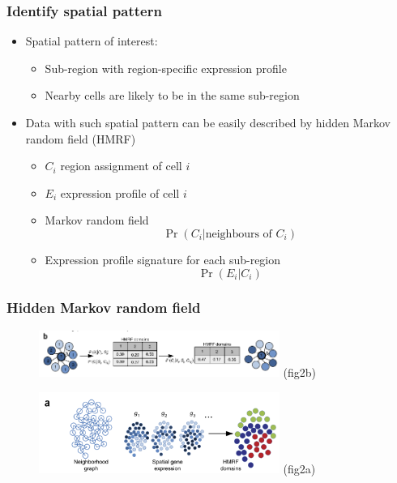 \documentclass{beamer}
\begin{document}
  \begin{frame}
  \frametitle{Identify spatial pattern}
  \begin{itemize}
    \item Spatial pattern of interest:
    \begin{itemize}
      \item Sub-region with region-specific expression profile
      \item Nearby cells are likely to be in the same sub-region
    \end{itemize}
    \item Data with such spatial pattern can be easily described by hidden Markov random field (HMRF)
    \begin{itemize}
      \item $C_i$ region assignment of cell $i$
      \item $E_i$ expression profile of cell $i$
      \item Markov random field
        $$\Pr(C_i | \text{neighbours of } C_i)$$
      \item Expression profile signature for each sub-region
        $$\Pr(E_i | C_i)$$
    \end{itemize}
  \end{itemize}
  \end{frame}

  \begin{frame}
  \frametitle{Hidden Markov random field}
  \begin{figure}
    \centering
    \includegraphics[width=0.7\textwidth]{mrf} (fig2b)
  \end{figure}
  \begin{figure}
    \centering
    \includegraphics[width=0.7\textwidth]{hmrf} (fig2a)
  \end{figure}
  \end{frame}
\end{document}

